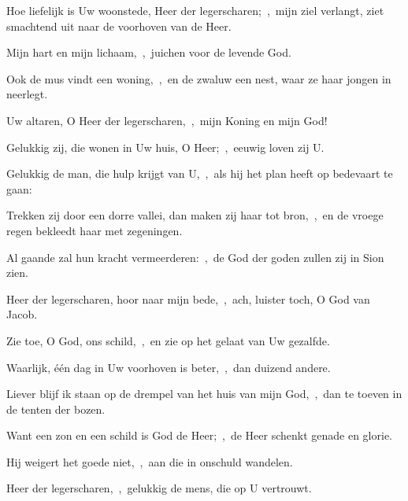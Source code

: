 \documentclass[12pt,twoside,a5paper]{article}
\begin{document}

\begin{halfparskip}

  Hoe liefelijk is Uw woonstede, Heer der legerscharen;~\sep\ mijn ziel verlangt, ziet smachtend uit naar de voorhoven van de Heer.


  Mijn hart en mijn lichaam,~\sep\ juichen voor de levende God.

  Ook de mus vindt een woning,~\sep\ en de zwaluw een nest, waar ze haar jongen in neerlegt.

  Uw altaren, O Heer der legerscharen,~\sep\ mijn Koning en mijn God!
\end{halfparskip}

\begin{halfparskip}

  Gelukkig zij, die wonen in Uw huis, O Heer;~\sep\ eeuwig loven zij U.

  Gelukkig de man, die hulp krijgt van U,~\sep\ als hij het plan heeft op bedevaart te gaan:

  Trekken zij door een dorre vallei, dan maken zij haar tot bron,~\sep\ en de vroege regen bekleedt haar met zegeningen.

  Al gaande zal hun kracht vermeerderen:~\sep\ de God der goden zullen zij in Sion zien.
\end{halfparskip}

\begin{halfparskip}

  Heer der legerscharen, hoor naar mijn bede,~\sep\ ach, luister toch, O God van Jacob.

  Zie toe, O God, ons schild,~\sep\ en zie op het gelaat van Uw gezalfde.

  Waarlijk, één dag in Uw voorhoven is beter,~\sep\ dan duizend andere.

  Liever blijf ik staan op de drempel van het huis van mijn God,~\sep\ dan te toeven in de tenten der bozen.

  Want een zon en een schild is God de Heer;~\sep\ de Heer schenkt genade en glorie.

  Hij weigert het goede niet,~\sep\ aan die in onschuld wandelen.

  Heer der legerscharen,~\sep\ gelukkig de mens, die op U vertrouwt.
\end{halfparskip}
\end{document}
